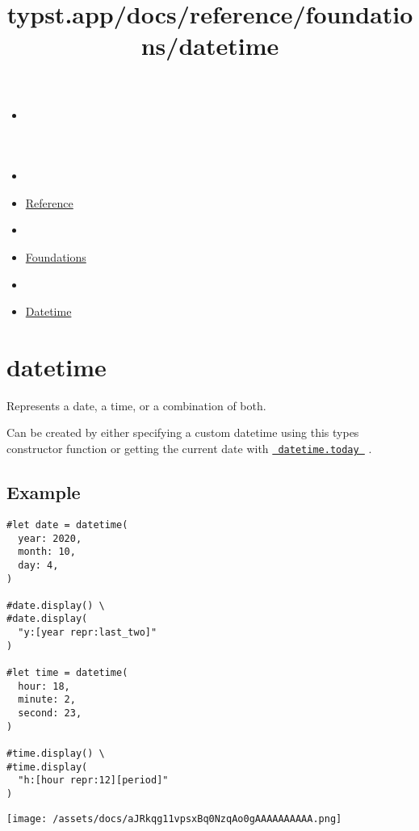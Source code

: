 \title{typst.app/docs/reference/foundations/datetime}

\begin{itemize}
\tightlist
\item
  \href{/docs}{}
\item
  
\item
  \href{/docs/reference/}{Reference}
\item
  
\item
  \href{/docs/reference/foundations/}{Foundations}
\item
  
\item
  \href{/docs/reference/foundations/datetime/}{Datetime}
\end{itemize}

\section{\texorpdfstring{{ datetime }}{ datetime }}\label{summary}

Represents a date, a time, or a combination of both.

Can be created by either specifying a custom datetime using this
type\textquotesingle s constructor function or getting the current date
with
\href{/docs/reference/foundations/datetime/\#definitions-today}{\texttt{\ datetime.today\ }}
.

\subsection{Example}\label{example}

\begin{verbatim}
#let date = datetime(
  year: 2020,
  month: 10,
  day: 4,
)

#date.display() \
#date.display(
  "y:[year repr:last_two]"
)

#let time = datetime(
  hour: 18,
  minute: 2,
  second: 23,
)

#time.display() \
#time.display(
  "h:[hour repr:12][period]"
)
\end{verbatim}

\texttt{[image: /assets/docs/aJRkqg11vpsxBq0NzqAo0gAAAAAAAAAA.png]}


